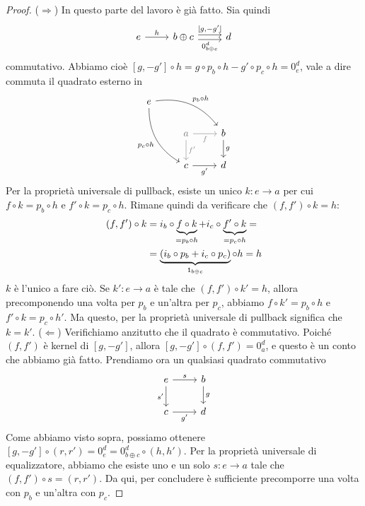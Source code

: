 \begin{proof}
  (\(\Rightarrow\)) In questo parte del lavoro è già fatto. Sia quindi
  \[
    \begin{tikzcd}
      e \ar["{h}", r] & b \oplus c \ar["{[g, -g']}", r, shift left]
      \ar["{0_{b \oplus c}^d}", r, shift right, swap] & d
    \end{tikzcd}
  \]
  commutativo. Abbiamo cioè
  \([g, -g'] \circ h = g \circ p_b \circ h - g' \circ p_c \circ h =
  0_e^d\), vale a dire commuta il quadrato esterno in
  \[
    \begin{tikzcd}
      e \ar["{p_b \circ h}", drr, bend left] \ar["{p_c \circ h}", ddr,
      swap,
      bend right] \\
      & {\color{gray} a} \ar["{f}" gray, gray, r, swap] \ar["{f'}" gray, gray, d] & b \ar["{g}", d] \\
      & c \ar["{g'}", r, swap] & d
    \end{tikzcd}
  \]
  Per la proprietà universale di pullback, esiste un unico
  \(k : e \to a\) per cui \(f \circ k = p_b \circ h\) e
  \(f' \circ k = p_c \circ h\). Rimane quindi da verificare che
  \((f, f') \circ k = h\):
  \begin{align*}
    (f, f') \circ k &= i_b \circ \underbrace{f \circ
                      k}_{\crampedclap{=p_b \circ h}} + i_c \circ \underbrace{f'
                      \circ k}_{\crampedclap{=p_c \circ h}} = \\
                    &= \underbrace{(i_b \circ p_b + i_c \circ
                      p_c)}_{\id_{b \oplus c}} \circ h = h
  \end{align*}
  \(k\) è l'unico a fare ciò. Se \(k' : e \to a\) è tale che
  \((f, f') \circ k' = h\), allora precomponendo una volta per \(p_b\) e
  un'altra per \(p_c\), abbiamo \(f \circ k' = p_b \circ h\) e
  \(f' \circ k = p_c \circ h'\). Ma questo, per la proprietà universale
  di pullback significa che \(k = k'\).\newline
  (\(\Leftarrow\)) Verifichiamo anzitutto che il quadrato è
  commutativo. Poiché \((f, f')\) è kernel di \([g, -g']\), allora
  \([g, -g'] \circ (f, f') = 0_a^d\), e questo è un conto che abbiamo
  già fatto. Prendiamo ora un qualsiasi quadrato commutativo
  \[
    \begin{tikzcd}
      e \ar["{s}", r] \ar["{s'}", d, swap] & b \ar["{g}", d] \\
      c \ar["{g'}", r, swap] & d
    \end{tikzcd}
  \]
  Come abbiamo visto sopra, possiamo ottenere
  \([g, -g'] \circ (r, r') = 0_e^d = 0_{b \oplus c}^d \circ (h,
  h')\). Per la proprietà universale di equalizzatore, abbiamo che
  esiste uno e un solo \(s : e \to a\) tale che
  \((f, f') \circ s = (r, r')\). Da qui, per concludere è sufficiente
  precomporre una volta con \(p_b\) e un'altra con \(p_c\). %
\end{proof}


